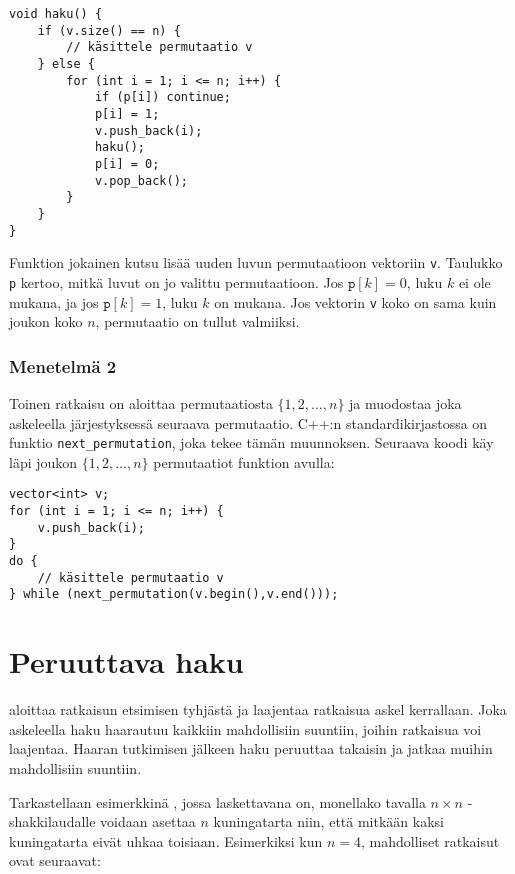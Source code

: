 \begin{lstlisting}
void haku() {
    if (v.size() == n) {
        // käsittele permutaatio v
    } else {
        for (int i = 1; i <= n; i++) {
            if (p[i]) continue;
            p[i] = 1;
            v.push_back(i);
            haku();
            p[i] = 0;
            v.pop_back();
        }
    }
}
\end{lstlisting}

Funktion jokainen kutsu lisää uuden
luvun permutaatioon vektoriin \texttt{v}.
Taulukko \texttt{p} kertoo, mitkä luvut on jo
valittu permutaatioon.
Jos $\texttt{p}[k]=0$, luku $k$ ei ole mukana,
ja jos $\texttt{p}[k]=1$, luku $k$ on mukana.
Jos vektorin \texttt{v} koko on sama kuin
joukon koko $n$, permutaatio on tullut valmiiksi.

\subsubsection{Menetelmä 2}


Toinen ratkaisu on aloittaa permutaatiosta
$\{1,2,\ldots,n\}$ ja muodostaa joka askeleella
järjestyksessä seuraava permutaatio.
C++:n standardikirjastossa on funktio
\texttt{next\_permutation}, joka tekee tämän muunnoksen.
Seuraava koodi käy läpi joukon $\{1,2,\ldots,n\}$
permutaatiot funktion avulla:

\begin{lstlisting}
vector<int> v;
for (int i = 1; i <= n; i++) {
    v.push_back(i);
}
do {
    // käsittele permutaatio v
} while (next_permutation(v.begin(),v.end()));
\end{lstlisting}

\section{Peruuttava haku}


aloittaa ratkaisun etsimisen tyhjästä
ja laajentaa ratkaisua askel kerrallaan.
Joka askeleella haku haarautuu kaikkiin
mahdollisiin suuntiin, joihin ratkaisua voi laajentaa.
Haaran tutkimisen jälkeen haku peruuttaa takaisin
ja jatkaa muihin mahdollisiin suuntiin.


Tarkastellaan esimerkkinä ,
jossa laskettavana on,
monellako tavalla $n \times n$ -shakkilaudalle
voidaan asettaa $n$ kuningatarta niin,
että mitkään kaksi kuningatarta eivät uhkaa toisiaan.
Esimerkiksi kun $n=4$, mahdolliset ratkaisut ovat seuraavat:

